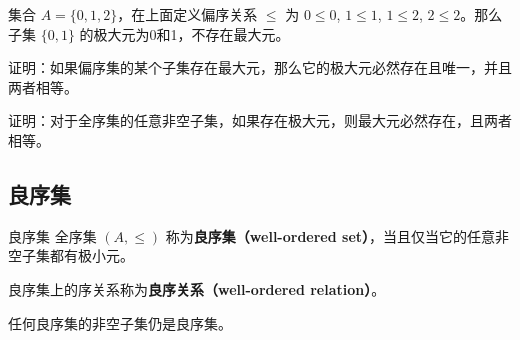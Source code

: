 \begin{example}{}
集合 $A=\{0,1,2\}$，在上面定义偏序关系 $\leq$ 为 $0\leq 0$, $1\leq 1$, $1\leq 2$, $2\leq 2$。那么子集 $\{0,1\}$ 的极大元为0和1，不存在最大元。
\end{example}

\begin{exercise}{}
证明：如果偏序集的某个子集存在最大元，那么它的极大元必然存在且唯一，并且两者相等。
\end{exercise}

\begin{exercise}{}
证明：对于全序集的任意非空子集，如果存在极大元，则最大元必然存在，且两者相等。
\end{exercise}

\subsection{良序集}

\begin{definition}{良序集}\label{def_OrdRel_1}
全序集 $(A,\leq)$ 称为\textbf{良序集（well-ordered set）}，当且仅当它的任意非空子集都有极小元。
\end{definition}

良序集上的序关系称为\textbf{良序关系（well-ordered relation）}。

任何良序集的非空子集仍是良序集。
